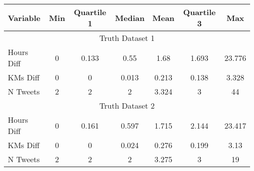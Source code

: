 \begin{tabular}{lcccccc} \hline Variable & Min & Quartile 1 & Median & Mean & Quartile 3 & Max \\ \hline \multicolumn{7}{c}{Truth Dataset 1} \\ Hours Diff  & 0  & 0.133  & 0.55  & 1.68  & 1.693  & 23.776  \\ KMs Diff  & 0  & 0  & 0.013  & 0.213  & 0.138  & 3.328  \\ N Tweets  & 2  & 2  & 2  & 3.324  & 3  & 44  \\ \hline \multicolumn{7}{c}{Truth Dataset 2} \\ Hours Diff  & 0  & 0.161  & 0.597  & 1.715  & 2.144  & 23.417  \\ KMs Diff  & 0  & 0  & 0.024  & 0.276  & 0.199  & 3.13  \\ N Tweets  & 2  & 2  & 2  & 3.275  & 3  & 19  \\ \hline \end{tabular} 